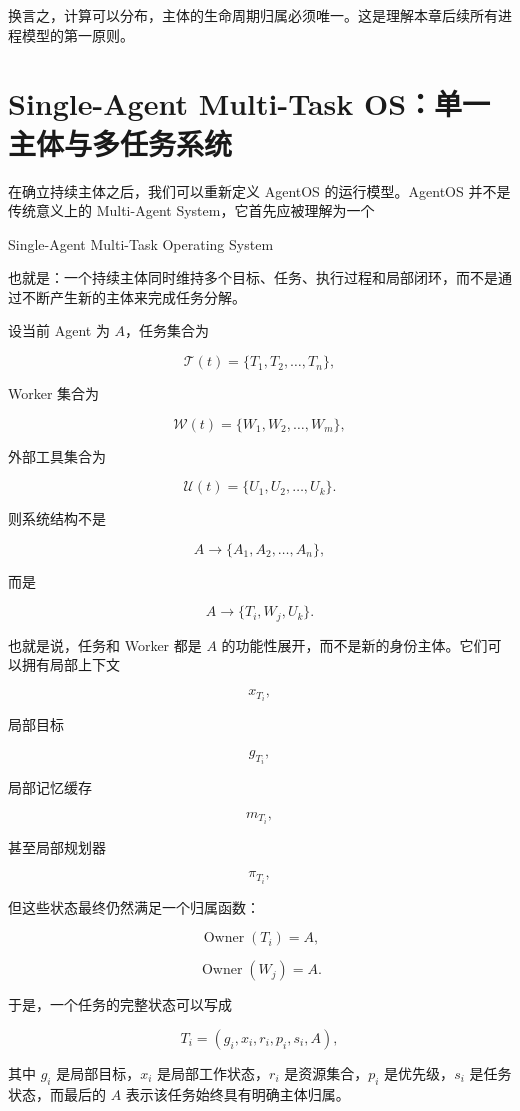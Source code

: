 换言之，计算可以分布，主体的生命周期归属必须唯一。这是理解本章后续所有进程模型的第一原则。

\section{Single-Agent Multi-Task OS：单一主体与多任务系统}

在确立持续主体之后，我们可以重新定义 AgentOS 的运行模型。AgentOS 并不是传统意义上的 Multi-Agent System，它首先应被理解为一个

\begin{definition*}
Single-Agent Multi-Task Operating System
\end{definition*}

也就是：一个持续主体同时维持多个目标、任务、执行过程和局部闭环，而不是通过不断产生新的主体来完成任务分解。

设当前 Agent 为 $A$，任务集合为

\[
\mathcal{T}(t)
=
\{T_1,T_2,\ldots,T_n\},
\]

Worker 集合为

\[
\mathcal{W}(t)
=
\{W_1,W_2,\ldots,W_m\},
\]

外部工具集合为

\[
\mathcal{U}(t)
=
\{U_1,U_2,\ldots,U_k\}.
\]

则系统结构不是

\[
A
\rightarrow
\{A_1,A_2,\ldots,A_n\},
\]

而是

\[
A
\rightarrow
\{
T_i,W_j,U_k
\}.
\]

也就是说，任务和 Worker 都是 $A$ 的功能性展开，而不是新的身份主体。它们可以拥有局部上下文

\[
x_{T_i},
\]

局部目标

\[
g_{T_i},
\]

局部记忆缓存

\[
m_{T_i},
\]

甚至局部规划器

\[
\pi_{T_i},
\]

但这些状态最终仍然满足一个归属函数：

\[
\operatorname{Owner}(T_i)
=
A,
\]

\[
\operatorname{Owner}(W_j)
=
A.
\]

于是，一个任务的完整状态可以写成

\[
T_i
=
(
g_i,
x_i,
r_i,
p_i,
s_i,
A
),
\]

其中 $g_i$ 是局部目标，$x_i$ 是局部工作状态，$r_i$ 是资源集合，$p_i$ 是优先级，$s_i$ 是任务状态，而最后的 $A$ 表示该任务始终具有明确主体归属。

